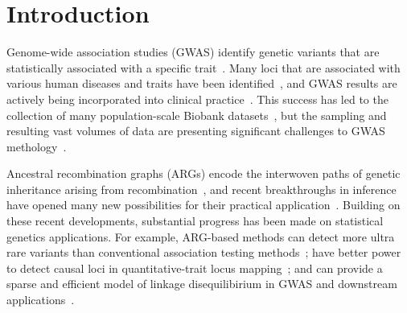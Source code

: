 \documentclass[unnumsec,webpdf,modern,large,namedate]{oup-authoring-template}%
\begin{document}

\maketitle

\section{Introduction}

Genome-wide association studies (GWAS)
identify genetic variants that are statistically
associated with a specific trait~\citep{uffelmann2021}.
Many loci that are associated with various human diseases and
traits have been identified~\citep{locke2015,ishigaki2022,
mahajan2022,yengo2022,mathieson2023},
and GWAS results are actively being incorporated into clinical
practice~\citep{visscher2017}.
This success has led to the collection of many population-scale Biobank
datasets~\citep{tanjo2021practical}, 
but the sampling and resulting vast volumes of data
are presenting significant challenges to GWAS 
methology~\citep{uffelmann2021}.

Ancestral recombination graphs (ARGs) encode the interwoven paths
of genetic inheritance arising from
recombination~\citep{hudson1983properties,griffiths1997ancestral,wong2023general},
and recent
breakthroughs in inference have opened many new possibilities for their
practical application~\citep{lewanski2023era}.
Building on these recent developments, substantial progress has been made
on statistical genetics applications.
For example,  ARG-based methods
can detect more ultra rare variants than conventional association testing
methods~\citep{zhang2023};
have better power to detect causal loci in
quantitative-trait locus mapping~\citep{link2023tree};
and can provide a sparse and efficient model of linkage disequilibirium
in GWAS and downstream applications~\citep{nowbandegani2023extremely}.
\end{document}
